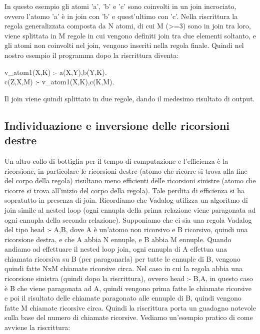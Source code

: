 In questo esempio gli atomi 'a', 'b' e 'c' sono coinvolti in un join incrociato, ovvero l'atomo 'a' è in join con 'b' e quest'ultimo con 'c'. \newline
Nella riscrittura la regola generalizzata composta da N atomi, di cui M (>=3) sono in join tra loro, viene splittata in M regole in cui vengono definiti join tra due elementi soltanto, e gli atomi non coinvolti nel join, vengono inseriti nella regola finale. \newline
Quindi nel nostro esempio il programma dopo la riscrittura diventa: 

\begin{algorithm}
	v\_atom1(X,K) :- a(X,Y),b(Y,K). \\
	c(Z,X,M) :- v\_atom1(X,K),c(K,M).
\end{algorithm}

Il join viene quindi splittato in due regole, dando il medesimo risultato di output.

\subsection{Individuazione e inversione delle ricorsioni destre}

Un altro collo di bottiglia per il tempo di computazione e l'efficienza è la ricorsione, in particolare le ricorsioni destre (atomo che ricorre si trova alla fine del corpo della regola) risultano meno efficienti delle ricorsioni sinistre (atomo che ricorre si trova all'inizio del corpo della regola). \newline
Tale perdita di efficienza si ha sopratutto in presenza di join. Ricordiamo che Vadalog utilizza un algoritmo di join simile al nested loop (ogni ennupla della prima relazione viene paragonata ad ogni ennupla della seconda relazione). \newline
Supponiamo che ci sia una regola Vadalog del tipo head :- A,B, dove A è un'atomo non ricorsivo e B ricorsivo, quindi una ricorsione destra, e che A abbia N ennuple, e B abbia M ennuple. \newline
Quando andiamo ad effettuare il nested loop join, ogni ennupla di A effettua una chiamata ricorsiva su B (per paragonarla) per tutte le ennuple di B, vengono quindi fatte NxM chiamate ricorsive circa. \newline
Nel caso in cui la regola abbia una ricorsione sinistra (quindi dopo la riscrittura), ovvero head :- B,A, in  questo caso è B che viene paragonata ad A, quindi vengono prima fatte le chiamate ricorsive e poi il risultato delle chiamate paragonato alle ennuple di B, quindi vengono fatte M chiamate ricorsive circa. Quindi la riscrittura porta un guadagno notevole sulla base del numero di chiamate ricorsive. \newline
Vediamo un'esempio pratico di come avviene la riscrittura: 

